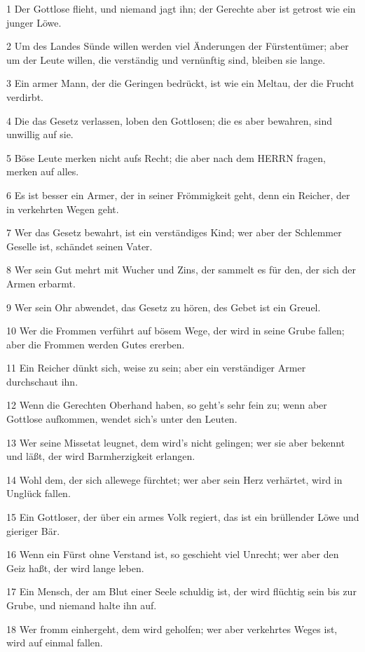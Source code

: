 \par 1 Der Gottlose flieht, und niemand jagt ihn; der Gerechte aber ist getrost wie ein junger Löwe.
\par 2 Um des Landes Sünde willen werden viel Änderungen der Fürstentümer; aber um der Leute willen, die verständig und vernünftig sind, bleiben sie lange.
\par 3 Ein armer Mann, der die Geringen bedrückt, ist wie ein Meltau, der die Frucht verdirbt.
\par 4 Die das Gesetz verlassen, loben den Gottlosen; die es aber bewahren, sind unwillig auf sie.
\par 5 Böse Leute merken nicht aufs Recht; die aber nach dem HERRN fragen, merken auf alles.
\par 6 Es ist besser ein Armer, der in seiner Frömmigkeit geht, denn ein Reicher, der in verkehrten Wegen geht.
\par 7 Wer das Gesetz bewahrt, ist ein verständiges Kind; wer aber der Schlemmer Geselle ist, schändet seinen Vater.
\par 8 Wer sein Gut mehrt mit Wucher und Zins, der sammelt es für den, der sich der Armen erbarmt.
\par 9 Wer sein Ohr abwendet, das Gesetz zu hören, des Gebet ist ein Greuel.
\par 10 Wer die Frommen verführt auf bösem Wege, der wird in seine Grube fallen; aber die Frommen werden Gutes ererben.
\par 11 Ein Reicher dünkt sich, weise zu sein; aber ein verständiger Armer durchschaut ihn.
\par 12 Wenn die Gerechten Oberhand haben, so geht's sehr fein zu; wenn aber Gottlose aufkommen, wendet sich's unter den Leuten.
\par 13 Wer seine Missetat leugnet, dem wird's nicht gelingen; wer sie aber bekennt und läßt, der wird Barmherzigkeit erlangen.
\par 14 Wohl dem, der sich allewege fürchtet; wer aber sein Herz verhärtet, wird in Unglück fallen.
\par 15 Ein Gottloser, der über ein armes Volk regiert, das ist ein brüllender Löwe und gieriger Bär.
\par 16 Wenn ein Fürst ohne Verstand ist, so geschieht viel Unrecht; wer aber den Geiz haßt, der wird lange leben.
\par 17 Ein Mensch, der am Blut einer Seele schuldig ist, der wird flüchtig sein bis zur Grube, und niemand halte ihn auf.
\par 18 Wer fromm einhergeht, dem wird geholfen; wer aber verkehrtes Weges ist, wird auf einmal fallen.
